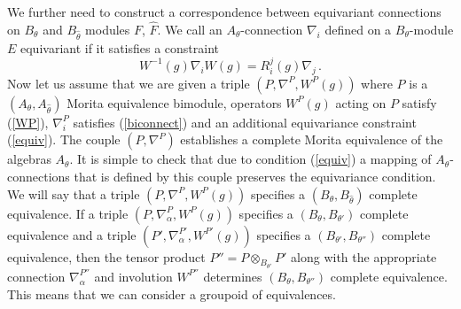 \documentclass[a4paper,a4paper]{article}
\begin{document}
{We further need to construct a correspondence between equivariant connections  on $B_{\theta}$ and $B_{\hat \theta}$ 
modules $F$, $\hat F$. We call an  $A_{\theta}$-connection $\nabla_{i}$ defined on a $B_{\theta}$-module $E$ 
equivariant if it satisfies a constraint 
\begin{equation} \label{equiv}
W^{-1}(g)\nabla_{i}W(g) = R^{j}_{i}(g)\nabla_{j} \, .
\end{equation}
Now let us assume  that we are given a triple $(P,  \nabla^{P},W^{P}(g))$ where $P$ is a 
 $(A_{\theta},A_{\hat \theta})$ Morita equivalence bimodule, operators $W^{P}(g)$ acting on $P$ satisfy (\ref{WP}), 
 $\nabla^{P}_{i}$ satisfies (\ref{biconnect}) and an additional equivariance constraint (\ref{equiv}).
The couple $(P, \nabla^{P})$ establishes a complete Morita equivalence of the algebras $A_{\theta}$. 
It is simple to check that due to condition (\ref{equiv}) a mapping of  $A_{\theta}$- connections that is defined by this 
couple preserves the equivariance condition. We will say that a triple $(P, \nabla^{P}, W^{P}(g))$ specifies a 
$(B_{\theta}, B_{\hat \theta})$ complete equivalence. 
If a triple $(P, \nabla_{\alpha}^{P}, W^{P}(g))$ specifies a $(B_{\theta}, B_{ \theta'})$ complete 
equivalence and a triple  $( P',  \nabla_{\alpha}^{P'},  W^{P'}(g))$ specifies a 
$(B_{ \theta'}, B_{\theta''})$ complete equivalence, then the tensor product 
$ P'' = P\otimes_{B_{\theta'}}  P'$ along with the appropriate connection $ \nabla_{\alpha}^{P''}$ and 
involution $  W^{P''}$ determines $(B_{\theta}, B_{ \theta''})$ complete equivalence. This means that we 
can consider a groupoid of equivalences. 



}
\end{document}
